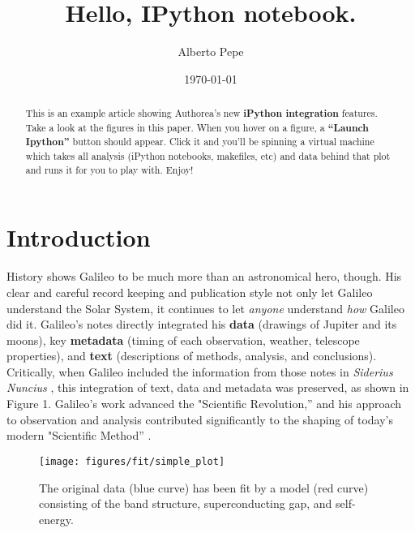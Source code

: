 \documentclass{article}
\begin{document}
\title{Hello, IPython notebook.}

\author{Alberto Pepe}


\date{\today}



\maketitle 

\begin{abstract}
This is an example article showing Authorea's new \textbf{iPython
integration} features. Take a look at the figures in this paper. When
you hover on a figure, a \textbf{``Launch Ipython''} button should
appear. Click it and you'll be spinning a virtual machine which takes
all analysis (iPython notebooks, makefiles, etc) and data behind that
plot and runs it for you to play with. Enjoy!

\end{abstract}




\section{Introduction}
History shows Galileo to be much more than an
astronomical hero, though. His clear and careful record keeping and
publication style not only let Galileo understand the Solar System, it
continues to let \emph{anyone} understand \emph{how} Galileo did it.
Galileo's notes directly integrated his \textbf{data} (drawings of
Jupiter and its moons), key \textbf{metadata} (timing of each
observation, weather, telescope properties), and \textbf{text}
(descriptions of methods, analysis, and conclusions). Critically, when
Galileo included the information from those notes in \emph{Siderius
Nuncius} \cite{galilei}, this integration of text, data and metadata was
preserved, as shown in Figure 1. Galileo's work advanced the
"Scientific Revolution,'' and his approach to observation and analysis
contributed significantly to the shaping of today's modern "Scientific
Method'' \cite{galilei1618assayer,galilei1957discoveries}. 

\begin{figure}[h!]
\begin{center}
\texttt{[image: figures/fit/simple\_plot]}
\caption{The original data (blue curve) has been fit by a model (red curve) consisting of the band structure, superconducting gap, and self-energy.%
}
\end{center}
\end{figure}
\end{document}
